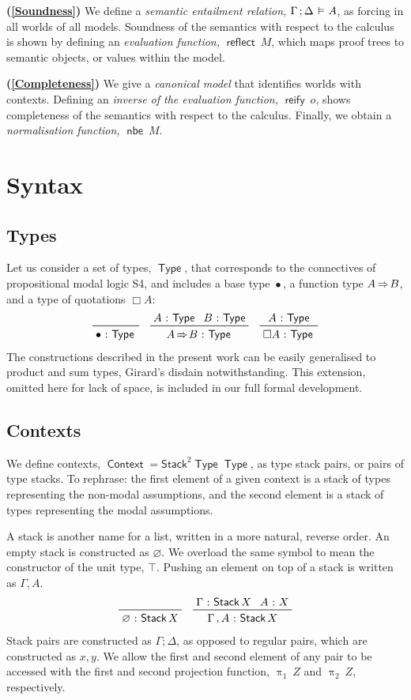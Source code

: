 \documentclass[submission,copyright,creativecommons,sharealike,backref=page]{eptcs}
\renewcommand{\:}{\mathop{\mkern3mu:\mkern3mu}}
\renewcommand{\.}{\mathop{\mkern3mu.\mkern3mu}}
\renewcommand{\;}{\mathop{;}}
\renewcommand{\,}{\mathop{,}}
\newcommand{\ef}{\mathrel{\mkern2mu\vDash\mkern1mu}}
\newcommand{\rf}{\mathop{\Rightarrow\mkern-1mu}}
\newcommand{\reflect}{\operatorname{\textsf{reflect}}}
\newcommand{\reify}{\operatorname{\textsf{reify}}}
\newcommand{\nbe}{\operatorname{\textsf{nbe}}}
\newcommand{\pii}{\operatorname{\uppi_{\scriptscriptstyle{1}}}}
\newcommand{\piii}{\operatorname{\uppi_{\scriptscriptstyle{2}}}}
\newcommand{\Stack}{\operatorname{\textsf{Stack}}}
\newcommand{\StackII}{\operatorname{\textsf{Stack}^{\scriptscriptstyle{2}}}}
\newcommand{\Type}{\operatorname{\textsf{Type}}}
\newcommand{\Context}{\operatorname{\textsf{Context}}}
\newcommand{\base}{\mathop{\bullet}}
\renewcommand{\O}{\varnothing}
\theoremstyle{mystyle}
\begin{document}
\textbf{(\ref{Soundness})} We define a \emph{semantic entailment relation,} $\Gamma \; \Delta \ef A$, as forcing in all worlds of all models.  Soundness of the semantics with respect to the calculus is shown by defining an \emph{evaluation function,} $\reflect~M$, which maps proof trees to semantic objects, or values within the model.

\textbf{(\ref{Completeness})} We give a \emph{canonical model} that identifies worlds with contexts.  Defining an \emph{inverse of the evaluation function,} $\reify~o$, shows completeness of the semantics with respect to the calculus.  Finally, we obtain a \emph{normalisation function,} $\nbe~M$.


\section{Syntax}\label{Syntax}

\subsection{Types}
Let us consider a set of types, $\Type$, that corresponds to the connectives of propositional modal logic S4, and includes a base type $\base$, a function type $A \rf B$, and a type of quotations $\Box A$:
\begin{align*}
  \prftree
    {}
    {\base \: \Type}
  \quad
  \prftree
    {A \: \Type}{B \: \Type}
    {A \rf B \: \Type}
  \quad
  \prftree
    {A \: \Type}
    {\Box A \: \Type}
\end{align*}
The constructions described in the present work can be easily generalised to product and sum types, Girard's disdain notwithstanding.  This extension, omitted here for lack of space, is included in our full formal development.

\subsection{Contexts}
We define contexts, $\Context = \StackII \Type \Type$, as type stack pairs, or pairs of type stacks.  To rephrase: the first element of a given context is a stack of types representing the non-modal assumptions, and the second element is a stack of types representing the modal assumptions.

A stack is another name for a list, written in a more natural, reverse order.  An empty stack is constructed as $\O$.  We overload the same symbol to mean the constructor of the unit type, $\top$.  Pushing an element on top of a stack is written as $\Gamma \, A$.
\begin{align*}
  \prftree
    {}
    {\O \: \Stack X}
  \quad
  \prftree
    {\Gamma \: \Stack X}{A \: X}
    {\Gamma \, A \: \Stack X}
\end{align*}
Stack pairs are constructed as $\Gamma \; \Delta$, as opposed to regular pairs, which are constructed as $x \, y$.  We allow the first and second element of any pair to be accessed with the first and second projection function, $\pii~Z$ and $\piii~Z$, respectively.
\end{document}
